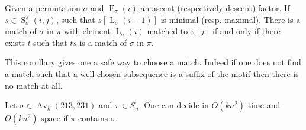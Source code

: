 \documentclass[a4paper]{llncs}
\DeclareMathOperator{\AV}{Av}
\newcommand{\ptext}{\pi}
\newcommand{\pmotif}{\sigma}
\DeclareMathOperator{\firsta}{L}
\newcommand{\first}[2]{\firsta_{{#1}}({#2})}
\DeclareMathOperator{\factora}{F}
\newcommand{\factor}[2]{\factora_{{#1}}({#2})}
\DeclareMathOperator{\SETa}{S}
\newcommand{\SET}[4]{\SETa_{{#1}}^{{#2}}({#3},{#4})}
\begin{document}
\begin{corollary}
Given a permutation $\pmotif$ and $\factor{\pmotif}{i}$ an ascent (respectively descent) factor.
If $s \in \SET{\pmotif}{\ptext}{i}{j}$, such that $s[\first{\pmotif}{i-1}]$ is minimal (resp. maximal). There is a match of $\pmotif$ in $\ptext$ with element $\first{\pmotif}{i}$ matched to $\ptext[j]$ if and only if there exists $t$ such that $ts$ is a match of $\pmotif$ in $\ptext$. 
\end{corollary}

This corollary gives one a safe way to choose a match. Indeed if one does not find a match such that a well chosen subsequence is a suffix of the motif then there is no match at all.

\begin{proposition}
	\label{Proposition:sigma avoids 213 and 231}
	Let $\sigma \in \AV_k(213,231)$ and $\pi \in S_n$.
	One can decide in $O(kn^2)$ time
	and $O(kn^2)$ space if $\pi$ contains $\sigma$.
\end{proposition}

\end{document}
